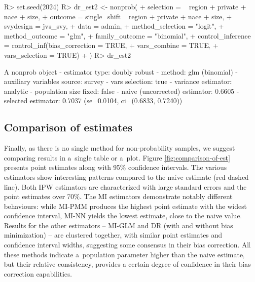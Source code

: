 \documentclass[nojss]{jss}
\begin{document}
\begin{CodeChunk}
\begin{CodeInput}
R> set.seed(2024)
R> dr_est2 <- nonprob(
+   selection = ~ region + private + nace + size,
+   outcome = single_shift ~ region + private + nace + size,
+   svydesign = jvs_svy,
+   data = admin,
+   method_selection = "logit",
+   method_outcome = "glm",
+   family_outcome = "binomial",
+   control_inference = control_inf(bias_correction = TRUE,
+                                   vars_combine = TRUE,
+                                   vars_selection = TRUE)
+ )
R> dr_est2
\end{CodeInput}
\begin{CodeOutput}
A nonprob object
 - estimator type: doubly robust
 - method: glm (binomial)
 - auxiliary variables source: survey
 - vars selection: true
 - variance estimator: analytic
 - population size fixed: false
 - naive (uncorrected) estimator: 0.6605
 - selected estimator: 0.7037 (se=0.0104, ci=(0.6833, 0.7240))
\end{CodeOutput}
\end{CodeChunk}

\subsection{Comparison of estimates}\label{comparison-of-estimates}

Finally, as there is no single method for non-probability samples, we
suggest comparing results in a~single table or a~plot. Figure
\ref{fig:comparison-of-est} presents point estimates along with 95\%
confidence intervals. The various estimators show interesting patterns
compared to the naive estimate (red dashed line). Both IPW estimators
are characterized with large standard errors and the point estimates
over 70\%. The MI estimators demonstrate notably different behaviours:
while MI-PMM produces the highest point estimate with the widest
confidence interval, MI-NN yields the lowest estimate, close to the
naive value. Results for the other estimators -- MI-GLM and DR (with and
without bias minimization) -- are clustered together, with similar point
estimates and confidence interval widths, suggesting some consensus in
their bias correction. All these methods indicate a~population parameter
higher than the naive estimate, but their relative consistency, provides
a certain degree of confidence in their bias correction capabilities.
\end{document}
